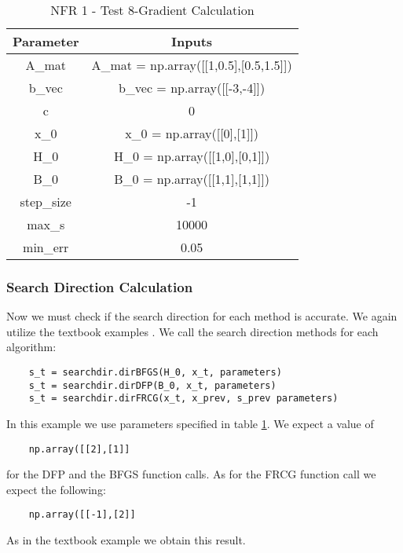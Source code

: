 \documentclass[12pt, titlepage]{article}
\begin{document}
\begin{table}[ht]
\caption{NFR 1 - Test 8-Gradient Calculation} \label{tbl_NFR1T8}
\vspace*{2mm}
\centering
 \begin{tabular}{|c|c|} 
 \hline
\textbf{Parameter} & \textbf{Inputs} \\ 
\hline
A\_mat&  A\_mat = np.array([[1,0.5],[0.5,1.5]])   \\
 \hline
 b\_vec& b\_vec = np.array([[-3,-4]])  \\ 
 \hline
 c& 0  \\ 
 \hline
 x\_0& x\_0 = np.array([[0],[1]]) \\ 
 \hline
 H\_0& H\_0 = np.array([[1,0],[0,1]])\\ 
 \hline
 B\_0& B\_0 = np.array([[1,1],[1,1]]) \\ 
 \hline
 step\_size& -1  \\ 
 \hline
 max\_s& 10000 \\ 
 \hline
 min\_err& 0.05  \\ 
 \hline
 
\end{tabular}
\end{table}


\subsubsection{Search Direction Calculation}

Now we must check if the search direction for each method is accurate. We again utilize the textbook examples \citep{Boyd2006}. We call the search direction methods for each algorithm:
\begin{lstlisting}
    s_t = searchdir.dirBFGS(H_0, x_t, parameters)
    s_t = searchdir.dirDFP(B_0, x_t, parameters)
    s_t = searchdir.dirFRCG(x_t, x_prev, s_prev parameters)
\end{lstlisting} 
In this example we use parameters specified in table \ref{tbl_NFR1T8}. We expect a value of 
\begin{verbatim}
    np.array([[2],[1]]
\end{verbatim}
for the DFP and the BFGS function calls. As for the FRCG function call we expect the following:
\begin{verbatim}
    np.array([[-1],[2]]
\end{verbatim}
As in the textbook example we obtain this result.
\end{document}
